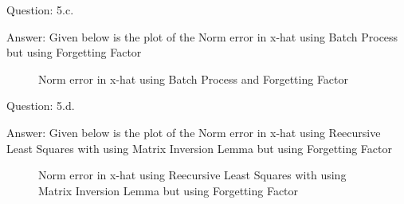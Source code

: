 \documentclass[a4paper]{article}
\begin{document}
\begin{qalist}
		\item[Question: 5.c.] \setcounter{equation}{0}
		\item[Answer:] Given below is the plot of the Norm error in x-hat using Batch Process but using Forgetting Factor
			\begin{figure}[H]			
				\vspace{0.5cm}
				\centering
				\caption{Norm error in x-hat using Batch Process and Forgetting Factor} 
				\label{fig:q5b}
				\vspace{0.5cm}
			\end{figure}
		
		\item[Question: 5.d.] \setcounter{equation}{0}
		\item[Answer:] Given below is the plot of the Norm error in x-hat using Reecursive Least Squares with using Matrix Inversion Lemma but using Forgetting Factor
			\begin{figure}[H]			
				\vspace{0.5cm}
				\centering
				\caption{Norm error in x-hat using Reecursive Least Squares with using Matrix Inversion Lemma but using Forgetting Factor} 
				\label{fig:q5d}
				\vspace{0.5cm}
			\end{figure}
	\end{qalist}
\end{document}
